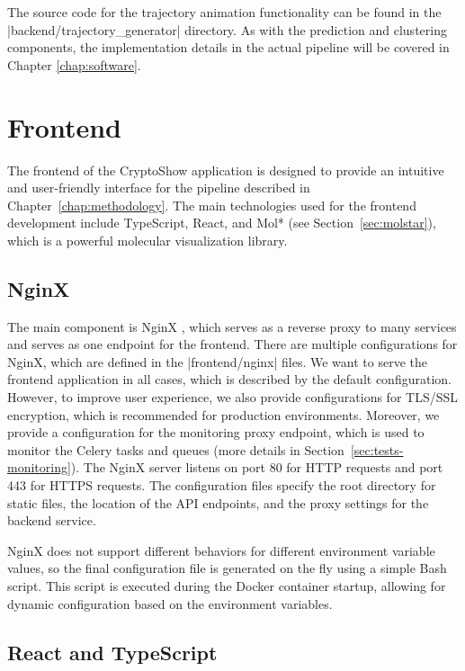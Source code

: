 The source code for the trajectory animation functionality can be found in the \inline|backend/trajectory_generator| directory. As with the prediction and clustering components, the implementation details in the actual pipeline will be covered in Chapter \ref{chap:software}.


\section{Frontend}
\label{sec:frontend}

The frontend of the CryptoShow application is designed to provide an intuitive and user-friendly interface for the pipeline described in Chapter~\ref{chap:methodology}. The main technologies used for the frontend development include TypeScript, React, and Mol* (see Section~\ref{sec:molstar}), which is a powerful molecular visualization library. 

\subsection{NginX}
\label{sec:nginx}

The main component is NginX \cite{reese2008nginx}, which serves as a reverse proxy to many services and serves as one endpoint for the frontend. There are multiple configurations for NginX, which are defined in the \inline|frontend/nginx| files. We want to serve the frontend application in all cases, which is described by the default configuration. However, to improve user experience, we also provide configurations for TLS/SSL encryption, which is recommended for production environments. Moreover, we provide a configuration for the monitoring proxy endpoint, which is used to monitor the Celery tasks and queues (more details in Section~\ref{sec:tests-monitoring}). The NginX server listens on port 80 for HTTP requests and port 443 for HTTPS requests. The configuration files specify the root directory for static files, the location of the API endpoints, and the proxy settings for the backend service.

NginX does not support different behaviors for different environment variable values, so the final configuration file is generated on the fly using a simple Bash script. This script is executed during the Docker container startup, allowing for dynamic configuration based on the environment variables.

\subsection{React and TypeScript}
\label{sec:react-typescript}

